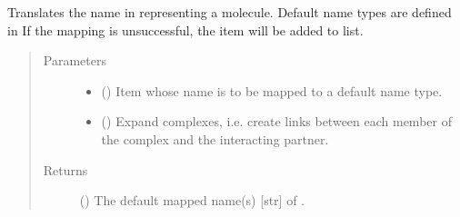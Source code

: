 \documentclass[letterpaper,10pt,english]{sphinxmanual}
\begin{document}
\begin{fulllineitems}
\begin{fulllineitems}
\begin{quote}
\begin{description}
\end{description}\end{quote}

\end{fulllineitems}


\begin{fulllineitems}
\label{\detokenize{reference:pypath.main.PyPath.map_item}}
Translates the name in  representing a molecule. Default
name types are defined in
 If the mapping
is unsuccessful, the item will be added to
 list.
\begin{quote}\begin{description}
\item[{Parameters}] \leavevmode\begin{itemize}
\item {} 
 () \textendash{} Item whose name is to be mapped to a default name type.

\item {} 
 () \textendash{} Expand complexes, i.e. create links between each member of
the complex and the interacting partner.

\end{itemize}

\item[{Returns}] \leavevmode
() \textendash{} The default mapped name(s) {[}str{]} of .

\end{description}\end{quote}

\end{fulllineitems}



\end{fulllineitems}
\end{document}

